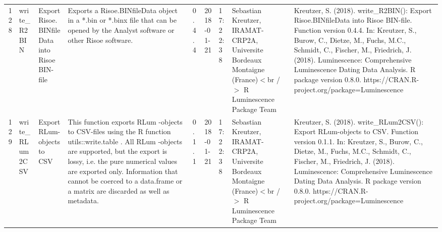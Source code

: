 \begin{table}[ht]
\begin{tabular}{rllllllll}
 \\ 
  128 & write\_R2BIN & Export Risoe.BINfileData into Risoe BIN-file & Exports a Risoe.BINfileData object in a *.bin or *.binx file that can be opened by the Analyst software or other Risoe software. & 0.4.4 & 2018-01-21 & 17:22:38
 & Sebastian Kreutzer, IRAMAT-CRP2A, Universite Bordeaux Montaigne (France)$<$br /$>$  R Luminescence Package Team & Kreutzer, S. (2018). write\_R2BIN(): Export Risoe.BINfileData into Risoe BIN-file. Function version 0.4.4. In: Kreutzer, S., Burow, C., Dietze, M., Fuchs, M.C., Schmidt, C., Fischer, M., Friedrich, J. (2018). Luminescence: Comprehensive Luminescence Dating Data Analysis. R package version 0.8.0. https://CRAN.R-project.org/package=Luminescence
 \\ 
  129 & write\_RLum2CSV & Export RLum-objects to CSV & This function exports  RLum -objects to CSV-files using the R function utils::write.table . All  RLum -objects are supported, but the export is lossy, i.e. the pure numerical values are exported only. Information that cannot be coerced to a  data.frame  or a  matrix  are discarded as well as metadata. & 0.1.1 & 2018-01-21 & 17:22:38
 & Sebastian Kreutzer, IRAMAT-CRP2A, Universite Bordeaux Montaigne (France)$<$br /$>$  R Luminescence Package Team & Kreutzer, S. (2018). write\_RLum2CSV(): Export RLum-objects to CSV. Function version 0.1.1. In: Kreutzer, S., Burow, C., Dietze, M., Fuchs, M.C., Schmidt, C., Fischer, M., Friedrich, J. (2018). Luminescence: Comprehensive Luminescence Dating Data Analysis. R package version 0.8.0. https://CRAN.R-project.org/package=Luminescence
 \\ 
   \hline
\end{tabular}
\end{table}


